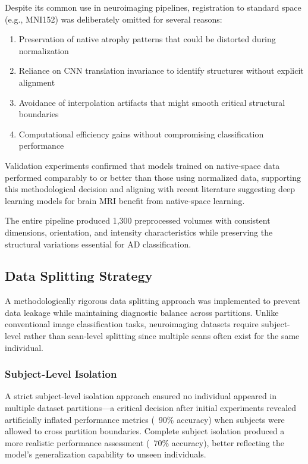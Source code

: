 \documentclass[12pt, a4paper]{article}
\begin{document}
Despite its common use in neuroimaging pipelines, registration to standard space (e.g., MNI152) was deliberately omitted for several reasons:
\begin{enumerate}
    \item Preservation of native atrophy patterns that could be distorted during normalization
    \item Reliance on CNN translation invariance to identify structures without explicit alignment
    \item Avoidance of interpolation artifacts that might smooth critical structural boundaries
    \item Computational efficiency gains without compromising classification performance
\end{enumerate}

Validation experiments confirmed that models trained on native-space data performed comparably to or better than those using normalized data, supporting this methodological decision and aligning with recent literature suggesting deep learning models for brain MRI benefit from native-space learning.

The entire pipeline produced 1,300 preprocessed volumes with consistent dimensions, orientation, and intensity characteristics while preserving the structural variations essential for AD classification.

\subsection{Data Splitting Strategy}

A methodologically rigorous data splitting approach was implemented to prevent data leakage while maintaining diagnostic balance across partitions. Unlike conventional image classification tasks, neuroimaging datasets require subject-level rather than scan-level splitting since multiple scans often exist for the same individual.

\subsubsection{Subject-Level Isolation}

A strict subject-level isolation approach ensured no individual appeared in multiple dataset partitions—a critical decision after initial experiments revealed artificially inflated performance metrics (~90\% accuracy) when subjects were allowed to cross partition boundaries. Complete subject isolation produced a more realistic performance assessment (~70\% accuracy), better reflecting the model's generalization capability to unseen individuals.
\end{document}
